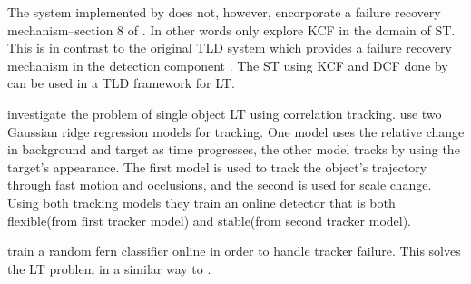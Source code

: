 The system implemented by \citeauthor{Enriques2014} does not, however, encorporate a failure recovery mechanism--section 8 of \cite{Enriques2014}.
In other words \citeauthor{Enriques2014} only explore KCF in the domain of ST.
This is in contrast to the original TLD system which provides a failure recovery mechanism in the detection component \cite{Kalal2011}.
The ST using KCF and DCF done by \citeauthor{Enriques2014} can be used in a TLD framework for LT.

\citeauthor{Ma2015Correlation} \cite{Ma2015Correlation} investigate the problem of single object LT using correlation tracking.
\citeauthor{Ma2015Correlation} use two Gaussian ridge regression \cite{murphy2012} models for tracking.
One model uses the relative change in background and target as time progresses, the other model tracks by using the target's appearance.
The first model is used to track the object's trajectory through fast motion and occlusions, and the second is used for scale change.
Using both tracking models they train an online detector that is both flexible(from first tracker model) and stable(from second tracker model).

\citeauthor{Ma2015Correlation} train a random fern classifier \cite{ferns2007} \cite{Kalal2011} online in order to handle tracker failure.
This solves the LT problem in a similar way to \citeauthor{KalalPHD}.
